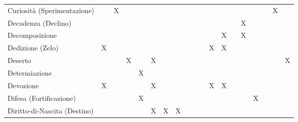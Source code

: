 \documentclass[10pt,a3paper]{memoir}
\begin{document}
\begin{table}[htpb]
\begin{tabular}{l|c|c|c|c|c|c|c|c|c|c|c|c|c|c|c|c|c|c}
Curiosit\`{a} (Sperimentazione) &  & X &  &  &  &  &  &  &  &  &  &  &  &  &  &  & X &  \\
Decadenza (Declino) &  &  &  &  &  &  &  &  &  &  &  &  &  & X &  &  &  &  \\
Decomposizione &  &  &  &  &  &  &  &  &  &  &  & X &  & X &  &  &  &  \\
Dedizione (Zelo) & X &  &  &  &  &  &  &  &  &  & X & X &  &  &  &  &  &  \\
Deserto &  &  & X &  & X &  &  &  &  &  &  &  &  &  &  &  &  & X \\
Determiazione &  &  &  & X &  &  &  &  &  &  &  &  &  &  &  &  &  &  \\
Devozione & X &  &  &  & X &  &  &  &  &  & X & X &  &  &  &  &  &  \\
Difesa (Fortificazione) &  &  &  & X &  &  &  &  &  &  &  &  &  &  & X &  &  &  \\
Diritto-di-Nascita (Destino) &  &  &  &  & X & X & X &  &  &  &  &  &  &  &  &  &  &  \\
\bottomrule
\end{tabular}
\end{table}
\end{document}
